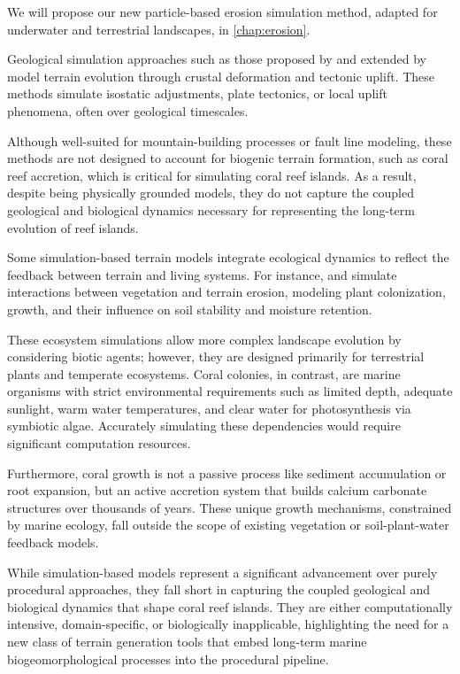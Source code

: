 We will propose our new particle-based erosion simulation method, adapted for underwater and terrestrial landscapes, in \cref{chap:erosion}.


Geological simulation approaches such as those proposed by \cite{Cordonnier2016, Cordonnier2017a} and extended by \cite{Schott2023} model terrain evolution through crustal deformation and tectonic uplift. These methods simulate isostatic adjustments, plate tectonics, or local uplift phenomena, often over geological timescales.

Although well-suited for mountain-building processes or fault line modeling, these methods are not designed to account for biogenic terrain formation, such as coral reef accretion, which is critical for simulating coral reef islands. As a result, despite being physically grounded models, they do not capture the coupled geological and biological dynamics necessary for representing the long-term evolution of reef islands.


Some simulation-based terrain models integrate ecological dynamics to reflect the feedback between terrain and living systems. For instance, \cite{Ecormier-Nocca2021} and \cite{Cordonnier2017b} simulate interactions between vegetation and terrain erosion, modeling plant colonization, growth, and their influence on soil stability and moisture retention.

These ecosystem simulations allow more complex landscape evolution by considering biotic agents; however, they are designed primarily for terrestrial plants and temperate ecosystems. Coral colonies, in contrast, are marine organisms with strict environmental requirements such as limited depth, adequate sunlight, warm water temperatures, and clear water for photosynthesis via symbiotic algae. Accurately simulating these dependencies would require significant computation resources.

Furthermore, coral growth is not a passive process like sediment accumulation or root expansion, but an active accretion system that builds calcium carbonate structures over thousands of years. These unique growth mechanisms, constrained by marine ecology, fall outside the scope of existing vegetation or soil-plant-water feedback models.

\midConclusion

While simulation-based models represent a significant advancement over purely procedural approaches, they fall short in capturing the coupled geological and biological dynamics that shape coral reef islands. They are either computationally intensive, domain-specific, or biologically inapplicable, highlighting the need for a new class of terrain generation tools that embed long-term marine biogeomorphological processes into the procedural pipeline.




